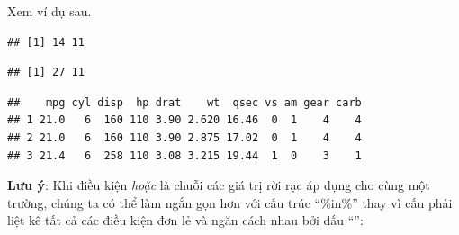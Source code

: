 \documentclass[]{krantz}
\makeatletter
\newenvironment{Shaded}{\begin{snugshade}}{\end{snugshade}}
\newcommand{\CommentTok}[1]{\textcolor[rgb]{0.37,0.37,0.37}{\textit{#1}}}
\newcommand{\DecValTok}[1]{\textcolor[rgb]{0.06,0.06,0.06}{#1}}
\newcommand{\KeywordTok}[1]{\textcolor[rgb]{0.27,0.27,0.27}{\textbf{#1}}}
\newcommand{\NormalTok}[1]{#1}
\newcommand{\OperatorTok}[1]{\textcolor[rgb]{0.43,0.43,0.43}{\textbf{#1}}}
\newcommand{\StringTok}[1]{\textcolor[rgb]{0.5,0.5,0.5}{#1}}
\newenvironment{kframe}{%
\medskip{}
\setlength{\fboxsep}{.8em}
 \def\at@end@of@kframe{}%
 \ifinner\ifhmode%
  \def\at@end@of@kframe{\end{minipage}}%
  \begin{minipage}{\columnwidth}%
 \fi\fi%
 \def\FrameCommand##1{\hskip\@totalleftmargin \hskip-\fboxsep
 \colorbox{shadecolor}{##1}\hskip-\fboxsep
     \hskip-\linewidth \hskip-\@totalleftmargin \hskip\columnwidth}%
 \MakeFramed {\advance\hsize-\width
   \@totalleftmargin\z@ \linewidth\hsize
   \@setminipage}}%
 {\par\unskip\endMakeFramed%
 \at@end@of@kframe}
\renewenvironment{Shaded}{\begin{kframe}}{\end{kframe}}
\renewenvironment{Shaded}{\begin{snugshade}}{\end{snugshade}}
\renewcommand{\CommentTok}[1]{\textcolor[rgb]{0.56,0.35,0.01}{\textit{#1}}}
\renewcommand{\DecValTok}[1]{\textcolor[rgb]{0.00,0.00,0.81}{#1}}
\renewcommand{\KeywordTok}[1]{\textcolor[rgb]{0.13,0.29,0.53}{\textbf{#1}}}
\renewcommand{\NormalTok}[1]{#1}
\renewcommand{\OperatorTok}[1]{\textcolor[rgb]{0.81,0.36,0.00}{\textbf{#1}}}
\renewcommand{\StringTok}[1]{\textcolor[rgb]{0.31,0.60,0.02}{#1}}
\theoremstyle{definition}
\theoremstyle{definition}
\theoremstyle{definition}
\theoremstyle{remark}
\makeatother
\begin{document}
Xem ví dụ sau.

\begin{Shaded}
\end{Shaded}

\begin{verbatim}
## [1] 14 11
\end{verbatim}

\begin{Shaded}
\end{Shaded}

\begin{verbatim}
## [1] 27 11
\end{verbatim}

\begin{Shaded}
\end{Shaded}

\begin{verbatim}
##    mpg cyl disp  hp drat    wt  qsec vs am gear carb
## 1 21.0   6  160 110 3.90 2.620 16.46  0  1    4    4
## 2 21.0   6  160 110 3.90 2.875 17.02  0  1    4    4
## 3 21.4   6  258 110 3.08 3.215 19.44  1  0    3    1
\end{verbatim}

\textbf{Lưu ý}: Khi điều kiện \emph{hoặc} là chuỗi các giá trị rời rạc
áp dụng cho cùng một trường, chúng ta có thể làm ngắn gọn hơn với cấu
trúc ``\%in\%'' thay vì cấu phải liệt kê tất cả các điều kiện đơn lẻ và
ngăn cách nhau bởi dấu ``\textbar{}'':
\end{document}
